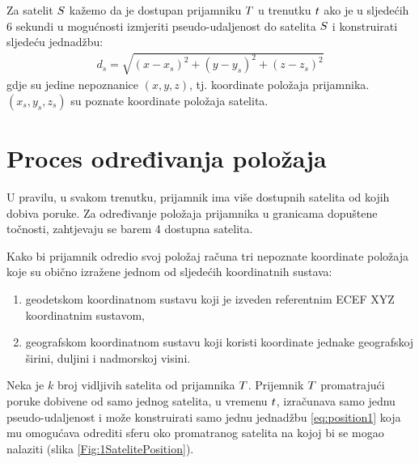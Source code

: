 \documentclass[a4paper,twoside,12pt]{memoir} %
\begin{document}
	\begin{defn}
		\label{stranica:dostupnost}
		Za satelit $\mathnormal{S}$ kažemo da je dostupan prijamniku $\mathnormal{T}$ u trenutku $\mathnormal{t}$ ako je u sljedećih 6 sekundi u mogućnosti izmjeriti
		pseudo-udaljenost do satelita $\mathnormal{S}$ i konstruirati sljedeću jednadžbu:
		\begin{align}\label{eq:position1}
		d_s = \sqrt{(x-x_s)^{2}+(y-y_s)^{2}+(z-z_s)^{2}}
		\end{align}
		gdje su jedine nepoznanice $(x,y,z)$, tj. koordinate položaja prijamnika.
		$(x_s,y_s,z_s)$ su poznate koordinate položaja satelita. 
	\end{defn}
	
	\section{Proces određivanja položaja}\label{sec:positionProcess}
	U pravilu, u svakom trenutku, prijamnik ima više dostupnih satelita od kojih dobiva poruke. Za određivanje položaja prijamnika u granicama dopuštene točnosti,
	zahtjevaju se barem 4 dostupna satelita\label{stranica:4satelita}.
	
	Kako bi prijamnik odredio svoj položaj računa tri nepoznate koordinate položaja koje su obično izražene jednom od sljedećih koordinatnih sustava:
	\begin{enumerate}
		\item geodetskom koordinatnom sustavu koji je izveden referentnim ECEF XYZ koordinatnim sustavom,
		\item geografskom koordinatnom sustavu koji koristi koordinate jednake geografskoj širini, duljini i nadmorskoj visini.
	\end{enumerate}
	
	Neka je $k$ broj vidljivih satelita od prijamnika $\mathnormal{T}$.
	Prijemnik $\mathnormal{T}$ promatrajući poruke dobivene od samo jednog satelita,
	u vremenu $\mathnormal{t}$, izračunava samo jednu pseudo-udaljenost i može konstruirati samo jednu jednadžbu \ref{eq:position1}
	 koja mu omogućava odrediti sferu oko promatranog satelita na kojoj bi se mogao nalaziti (slika \ref{Fig:1SatelitePosition}).
	
\end{document}
